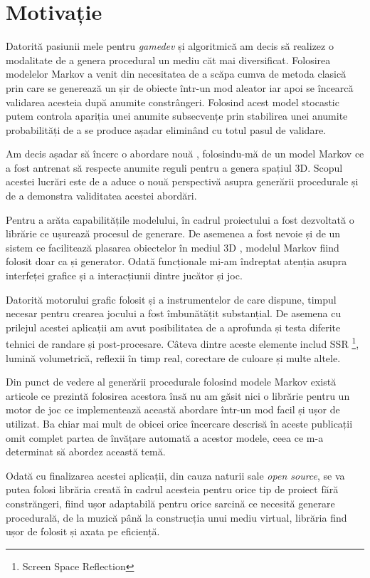 \chapter*{Motivație} 

Datorită pasiunii mele pentru \textit{gamedev} și algoritmică am decis să realizez o modalitate de a genera procedural un mediu căt mai diversificat. Folosirea modelelor Markov a venit din necesitatea de a scăpa cumva de metoda clasică prin care se generează un șir de obiecte într-un mod aleator iar apoi se încearcă validarea acesteia după anumite constrângeri. Folosind acest model stocastic putem controla apariția unei anumite subsecvențe prin stabilirea unei anumite probabilități de a se produce așadar eliminând cu totul pasul de validare.\par

Am decis așadar să încerc o abordare nouă , folosindu-mă de un model Markov ce a fost antrenat să respecte anumite reguli pentru a genera spațiul 3D. Scopul acestei lucrări este de a aduce o nouă perspectivă asupra generării procedurale și de a demonstra validitatea acestei abordări.\par

Pentru a arăta capabilitățile modelului, în cadrul proiectului a fost dezvoltată o librărie ce ușurează procesul de generare. De asemenea a fost nevoie și de un sistem ce facilitează plasarea obiectelor în mediul 3D , modelul Markov fiind folosit doar ca și generator. Odată funcționale mi-am îndreptat atenția asupra interfeței grafice și a interacțiunii dintre jucător și joc.\par

Datorită motorului grafic folosit și a instrumentelor de care dispune, timpul necesar pentru crearea jocului a fost îmbunătățit substanțial. De asemena cu prilejul acestei aplicații am avut posibilitatea de a aprofunda și testa diferite tehnici de randare și post-procesare. Câteva dintre aceste elemente includ SSR \footnote{Screen Space Reflection}, lumină volumetrică, reflexii în timp real, corectare de culoare și multe altele.\par

Din punct de vedere al generării procedurale folosind modele Markov există articole ce prezintă folosirea acestora însă nu am găsit nici o librărie pentru un motor de joc ce implementează această abordare într-un mod facil și ușor de utilizat. Ba chiar mai mult de obicei orice încercare descrisă în aceste publicații omit complet partea de învățare automată a acestor modele, ceea ce m-a determinat să abordez această temă.\par

Odată cu finalizarea acestei aplicații, din cauza naturii sale \textit{open source}, se va putea folosi librăria creată în cadrul acesteia pentru orice tip de proiect fără constrăngeri, fiind ușor adaptabilă pentru orice sarcină ce necesită generare procedurală, de la muzică până la construcția unui mediu virtual, librăria find ușor de folosit și axata pe eficiență.\par
